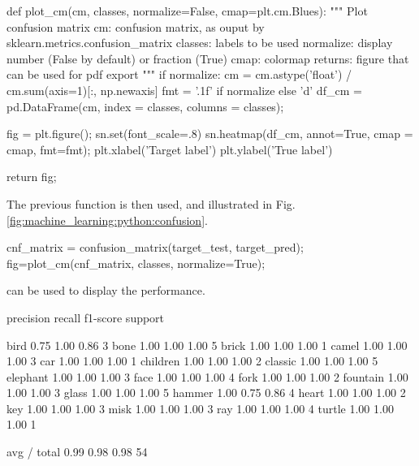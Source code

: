 \begin{python}
def plot_cm(cm, classes, normalize=False, cmap=plt.cm.Blues):
    """
    Plot confusion matrix
    cm: confusion matrix, as ouput by sklearn.metrics.confusion_matrix
    classes: labels to be used
    normalize: display number (False by default) or fraction (True)
    cmap: colormap
    returns: figure that can be used for pdf export
    """
    if normalize:
        cm = cm.astype('float') / cm.sum(axis=1)[:, np.newaxis] 
    fmt = '.1f' if normalize else 'd'
    df_cm = pd.DataFrame(cm, index = classes, columns = classes);
    
    fig = plt.figure();
    sn.set(font_scale=.8)
    sn.heatmap(df_cm, annot=True, cmap = cmap, fmt=fmt);
    plt.xlabel('Target label')
    plt.ylabel('True label')
    
    return fig;
\end{python}

The previous function is then used, and illustrated in Fig.\ref{fig:machine_learning:python:confusion}.
\begin{python}
cnf_matrix = confusion_matrix(target_test, target_pred);
fig=plot_cm(cnf_matrix, classes, normalize=True);
\end{python}

 can be used to display the performance.

\begin{sh}
             precision    recall  f1-score   support

       bird       0.75      1.00      0.86         3
       bone       1.00      1.00      1.00         5
      brick       1.00      1.00      1.00         1
      camel       1.00      1.00      1.00         3
        car       1.00      1.00      1.00         1
   children       1.00      1.00      1.00         2
    classic       1.00      1.00      1.00         5
   elephant       1.00      1.00      1.00         3
       face       1.00      1.00      1.00         4
       fork       1.00      1.00      1.00         2
   fountain       1.00      1.00      1.00         3
      glass       1.00      1.00      1.00         5
     hammer       1.00      0.75      0.86         4
      heart       1.00      1.00      1.00         2
        key       1.00      1.00      1.00         3
       misk       1.00      1.00      1.00         3
        ray       1.00      1.00      1.00         4
     turtle       1.00      1.00      1.00         1

avg / total       0.99      0.98      0.98        54
\end{sh}

